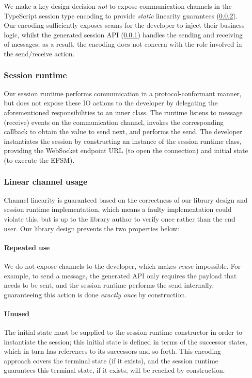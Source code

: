We make a key design decision \textit{not} to expose communication channels in
the TypeScript session type encoding to provide \textit{static} linearity
guarantees (\cref{section:serverlinear}).
Our encoding sufficiently exposes seams for the developer to inject their
business logic, whilst the generated session API
(\cref{section:serversessionapi}) handles the sending and receiving of
messages;
as a result, the encoding does not concern with the role involved in the
send/receive action.

\subsubsection{Session runtime}
\label{section:serversessionapi}

Our session runtime performs communication in a protocol-conformant manner, but
does not expose these IO actions to the developer by delegating the
aforementioned responsibilities to an inner class.
The runtime listens to message (receive) events on the communication channel,
invokes the corresponding callback to obtain the value to send next, and
performs the send.
The developer instantiates the session by constructing an instance of the
session runtime class, providing the WebSocket endpoint URL (to open the
connection) and initial state (to execute the EFSM).

\subsubsection{Linear channel usage}
\label{section:serverlinear}
Channel linearity is guaranteed based on the correctness of our library design
and session runtime implementation, which means a faulty implementation could
violate this, but is up to the library author to verify once rather than the
end user. Our library design prevents the two properties below:

\paragraph{Repeated use}
We do not expose channels to the developer, which makes \textit{reuse}
impossible.
For example, to send a message, the generated API only requires the payload
that needs to be sent, and the session runtime performs the send internally,
guaranteeing this action is done \textit{exactly once} by construction.

\paragraph{Unused}
The initial state must be supplied to the session runtime
constructor in order to instantiate the session;
this initial state is defined
in terms of the successor states, which in turn has references to its
successors and so forth.
This encoding approach covers the terminal state (if it exists), and the
session runtime guarantees this terminal state, if it exists, will be reached
by construction.

